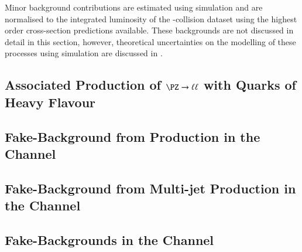 Minor background contributions are estimated using simulation and are normalised
to the integrated luminosity of the \pp-collision dataset using the highest
order cross-section predictions available. These backgrounds are not discussed
in detail in this section, however, theoretical uncertainties on the modelling
of these processes using simulation are discussed in
.

\subsection{Associated Production of $\PZ \to \ell\ell$ with Quarks of Heavy Flavour}%
\label{sec:bkg_zjets}


\subsection{Fake-\tauhadvis Background from \ttbar Production in the \hadhad Channel}%
\label{sec:bkg_hadhad_ttbarfakes}


\subsection{Fake-\tauhadvis Background from Multi-jet Production in the \hadhad Channel}%
\label{sec:bkg_hadhad_ff}


\subsection{Fake-\tauhadvis Backgrounds in the \lephad Channel}%
\label{sec:bkg_lephad_combined_ff}



